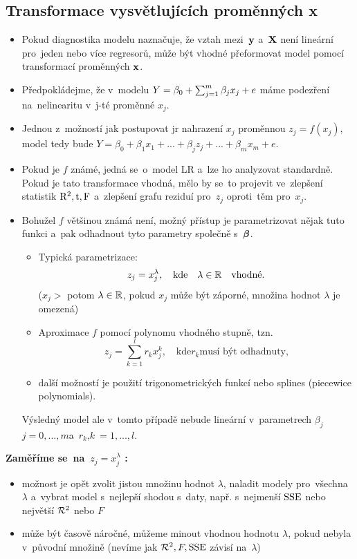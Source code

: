 \subsection{Transformace vysvětlujících proměnných x}

\begin{itemize}
\item Pokud diagnostika modelu naznačuje, že vztah mezi~$\textbf{y}$ a~$\textbf{X}$ není lineární pro~jeden nebo více regresorů, může být vhodné přeformovat model pomocí transformací proměnných $\textbf{x}$.

\item Předpokládejme, že v~modelu $Y = \beta_0 + \sum_{j=1}^{m} \beta_j x_j + e$ máme podezření na~nelinearitu v~j-té proměnné $x_j$.

\item Jednou z~možností jak postupovat jr nahrazení $x_j$ proměnnou $z_j = f(x_j)$, model tedy bude $Y = \beta_0 + \beta_1 x_1 +... + \beta_j z_j +... + \beta_m x_m + e$.

\item Pokud je $f$ známé, jedná se~o~model LR a~lze ho analyzovat standardně. Pokud je tato transformace vhodná, mělo by se~to projevit ve~zlepšení statistik $\mathrm{R}^2, \mathrm{t}, \text{F}$ a~zlepšení grafu reziduí pro~$z_j$ oproti~těm pro~$x_j$.

\item Bohužel $f$ většinou známá není, možný přístup je parametrizovat nějak tuto funkci a~pak odhadnout tyto parametry společně s~$\boldsymbol{\beta}$.

\begin{itemize}

\item Typická parametrizace:
 $$
  z_j = x_j^{\lambda}, \quad \text{kde} \quad \lambda \in \mathbb{R} \quad \text{vhodné}.
 $$
($x_j >$ potom $\lambda \in \mathbb{R}$, pokud $x_j$ může být záporné, množina hodnot $\lambda$ je omezená)
\item Aproximace $f$ pomocí polynomu vhodného stupně, tzn.
 $$
  z_j = \sum_{k = 1}^l r_k x_j^k, \quad \text{kde} r_k \text{musí být odhadnuty,}
 $$
\item další možností je použití trigonometrických funkcí nebo splines (piecewice polynomials).

\end{itemize}

Výsledný model ale v~tomto případě nebude lineární v~parametrech $\beta_j$$ j = 0,...,m $a~$ r_k $,$ k~ = 1,...,l $.
\end{itemize}\textbf{Zaměříme se~na~$z_j = x_j^\lambda$ :}
\begin{itemize}
	\item možnost je opět zvolit jistou množinu hodnot $\lambda$, naladit modely pro~všechna $\lambda$ a~vybrat model s~nejlepší shodou s~daty, např. s~nejmenší $\mathrm{SSE}$ nebo největší $\mathcal{R}^2$ nebo $F$
	\item může být časově náročné, můžeme minout vhodnou hodnotu $\lambda$, pokud nebyla v~původní množině (nevíme jak $\mathcal{R}^2,F,\mathrm{SSE}$ závisí na~$\lambda$)
\end{itemize}

